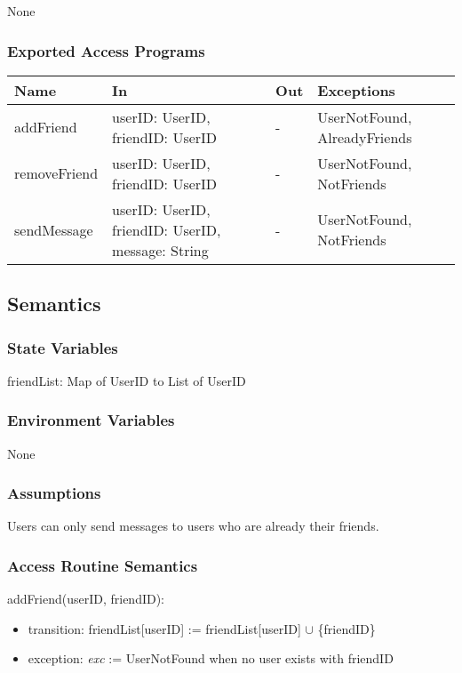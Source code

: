 \documentclass[12pt, titlepage]{article}
\begin{document}
None

\subsubsection{Exported Access Programs}

\begin{center}
\begin{tabular}{p{2.5cm} p{5cm} p{2cm} p{3cm}}
\hline
\textbf{Name} & \textbf{In} & \textbf{Out} & \textbf{Exceptions} \\
\hline
addFriend & userID: UserID, friendID: UserID & - & UserNotFound, AlreadyFriends \\
removeFriend & userID: UserID, friendID: UserID & - & UserNotFound, NotFriends \\
sendMessage & userID: UserID, friendID: UserID, message: String & - & UserNotFound, NotFriends \\
\hline
\end{tabular}
\end{center}

\subsection{Semantics}

\subsubsection{State Variables}

friendList: Map of UserID to List of UserID

\subsubsection{Environment Variables}

None

\subsubsection{Assumptions}

Users can only send messages to users who are already their friends.

\subsubsection{Access Routine Semantics}

\noindent addFriend(userID, friendID):
\begin{itemize}
\item transition: friendList[userID] := friendList[userID] $\cup$ \{friendID\}
\item exception: \textit{exc} := UserNotFound when no user exists with friendID
\end{itemize}
\end{document}
